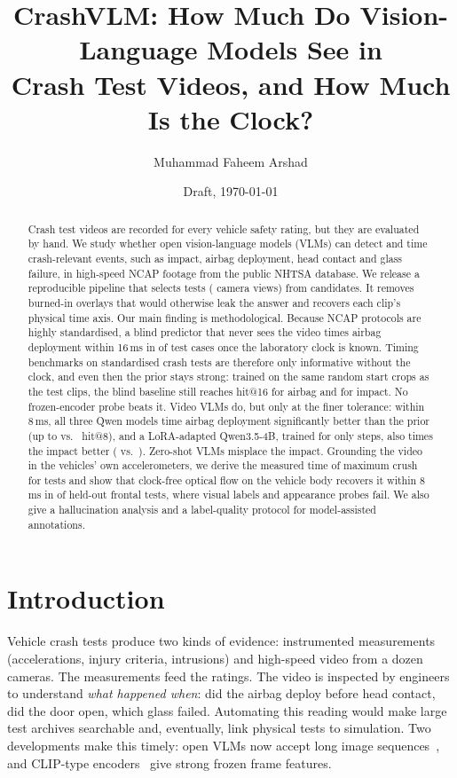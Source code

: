 \documentclass[10pt,twocolumn]{article}
\title{CrashVLM: How Much Do Vision-Language Models See in\\Crash Test Videos, and How Much Is the Clock?}
\author{Muhammad Faheem Arshad}
\date{Draft, \today}
\begin{document}
\maketitle

\begin{abstract}
Crash test videos are recorded for every vehicle safety rating, but they are evaluated by hand.
We study whether open vision-language models (VLMs) can detect and time crash-relevant events,
such as impact, airbag deployment, head contact and glass failure, in high-speed NCAP footage
from the public NHTSA database. We release a reproducible pipeline that selects
\NTests{} tests (\NClips{} camera views) from \NCatalog{} candidates. It removes burned-in
overlays that would otherwise leak the answer and recovers each clip's physical time axis. Our
main finding is methodological. Because NCAP protocols are highly standardised, a blind predictor
that never sees the video times airbag deployment within 16\,ms in \BlindAirbagKnown{} of test
cases once the laboratory clock is known. Timing benchmarks on standardised crash tests are
therefore only informative without the clock, and even then the prior stays strong: trained on
the same random start crops as the test clips, the blind baseline still reaches
\BlindAirbagSixteen{} hit@16 for airbag and \BlindImpactSixteen{} for impact. No frozen-encoder
probe beats it. Video VLMs do, but only at the finer tolerance: within 8\,ms, all three Qwen
models time airbag deployment significantly better than the prior (up to \VlAirbagEight{} vs.\
\BlindAirbagEight{} hit@8), and a LoRA-adapted Qwen3.5-4B, trained for only \LoraSteps{} steps,
also times the impact better (\LoraImpactEight{} vs.\ \BlindImpactEight{}). Zero-shot VLMs
misplace the impact. Grounding the video in the vehicles' own accelerometers, we derive the
measured time of maximum crush for \NPhysics{} tests and show that clock-free optical flow on
the vehicle body recovers it within 8\,ms in \FlowHeldOutWithinEight{} of \NFlowHeldOut{}
held-out frontal tests, where visual labels and appearance probes fail. We also give a
hallucination analysis and a label-quality protocol for model-assisted annotations.
\end{abstract}

\section{Introduction}
Vehicle crash tests produce two kinds of evidence: instrumented measurements (accelerations,
injury criteria, intrusions) and high-speed video from a dozen cameras. The measurements feed
the ratings. The video is inspected by engineers to understand \emph{what happened when}: did
the airbag deploy before head contact, did the door open, which glass failed. Automating this
reading would make large test archives searchable and, eventually, link physical tests to
simulation. Two developments make this timely: open VLMs now accept long image
sequences~\citep{bai2025qwen3vl,wang2025internvl35}, and CLIP-type
encoders~\citep{radford2021clip,zhai2023siglip,tschannen2025siglip2} give strong frozen frame
features.
\end{document}
